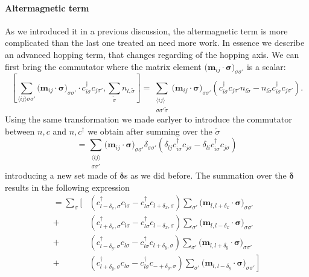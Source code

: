 \documentclass[../main.tex]{subfile}
\begin{document}
\paragraph{Altermagnetic term}
As we introduced it in a previous discussion, the altermagnetic term is more complicated than the last one treated an need more work. In essence we describe an 
advanced hopping term, that changes regarding of the hopping axis.
We can first bring the commutator where the matrix element $\bigl(\bm{m}_{ij}\cdot\bm{\sigma}\bigr)_{\sigma\sigma'} $ is a scalar:
\begin{equation*}
    \left[\sum_{\langle i j \rangle\sigma\sigma'}\bigl(\bm{m}_{ij}\cdot\bm{\sigma}\bigr)_{\sigma\sigma'} 
        \cdot c_{i\sigma}^{\dagger}c_{j\sigma'}, \sum_{\tilde{\sigma}} n_{l,\tilde{\sigma}}\right] 
    =\sum_{\substack{\langle i j \rangle \\\sigma\sigma'\tilde{\sigma}}} 
        \bigl(\bm{m}_{ij}\cdot\bm{\sigma}\bigr)_{\sigma\sigma'}  \left(c_{i\sigma}^{\dagger}c_{j\sigma'}n_{l\tilde{\sigma}} 
        -n_{l\tilde{\sigma}}c_{i\sigma}^{\dagger}c_{j\sigma'} \right).
\end{equation*}
Using the same transformation we made earlyer to introduce the commutator between $n,c$ and $n,c^{\dagger}$ we obtain after summing over the $\tilde{\sigma}$
\[
    = \sum_{\substack{\langle i j \rangle \\\sigma\sigma'}}  \bigl(\bm{m}_{ij}\cdot\bm{\sigma}\bigr)_{\sigma\sigma'}  
        \delta_{\sigma\sigma'} \left(\delta_{lj}c_{i\sigma}^{\dagger}c_{j\sigma} - \delta_{li}c_{i\sigma}^{\dagger}c_{j\sigma}\right)
\]
introducing a new set made of  $\bm{\delta}$s as we did before. The summation over the $\bm{\delta}$ results in the following  expression
\begin{equation}\label{eq:CurrentAltermagCommu}
    \begin{aligned}
        = \sum_{\sigma}\Biggl[&
                \left(c_{l-\delta_x,\sigma}^{\dagger}c_{l\sigma} - c_{l\sigma}^{\dagger}c_{l+\delta_x,\sigma} \right) 
                    \sum_{\sigma'}\bigl(\bm{m}_{l,l+\delta_x}\cdot\bm{\sigma}\bigr)_{\sigma\sigma'}\\
                +&\left(c_{l+\delta_x,\sigma}^{\dagger}c_{l\sigma} - c_{l\sigma}^{\dagger}c_{l-\delta_x,\sigma} \right) 
                    \sum_{\sigma'}\bigl(\bm{m}_{l,l-\delta_x}\cdot\bm{\sigma}\bigr)_{\sigma\sigma'}\\
                +&\left(c_{l-\delta_y,\sigma}^{\dagger}c_{l\sigma} - c_{l\sigma}^{\dagger}c_{l+\delta_y,\sigma} \right) 
                    \sum_{\sigma'}\bigl(\bm{m}_{l,l+\delta_y}\cdot\bm{\sigma}\bigr)_{\sigma\sigma'}\\
                +&\left.\left(c_{l+\delta_y,\sigma}^{\dagger}c_{l\sigma} - c_{l\sigma}^{\dagger}c_{-+\delta_y,\sigma} \right) 
                    \sum_{\sigma'}\bigl(\bm{m}_{l,l-\delta_y}\cdot\bm{\sigma}\bigr)_{\sigma\sigma'}\right]
    \end{aligned}
\end{equation} 
\end{document}
